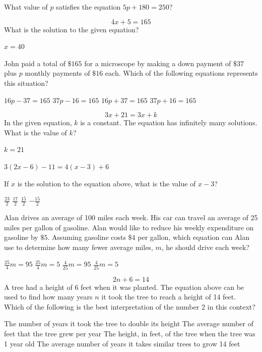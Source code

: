 \question[1]
What value of $p$ satisfies the equation $5p + 180 = 250$?
\begin{choices}
\end{choices}

\newpage 


\question[1]
$$
4x + 5 = 165
$$
What is the solution to the given equation?
\begin{solutionorbox}
$x=40$
\end{solutionorbox}

\question[1]
John paid a total of $\$ 165$ for a microscope by making a down payment of $\$ 37$ plus $p$ monthly payments of $\$ 16$ each. Which of the following equations represents this situation?
\begin{choices}
  \choice $16p - 37 = 165$
  \choice $37p - 16 = 165$
  \CorrectChoice $16p + 37 = 165$
  \choice $37p + 16 = 165$
\end{choices}

\question[1]
$$
3x + 21 = 3x + k
$$
In the given equation, $k$ is a constant. The equation has infinitely many solutions. What is the value of $k$?
\begin{solutionorbox}
$k=21$
\end{solutionorbox}

\newpage

\question[1]
$3(2x - 6) - 11 = 4(x - 3) + 6$

If $x$ is the solution to the equation above, what is the value of $x - 3$?
\begin{choices}
  \choice $\frac{23}{2}$
  \CorrectChoice $\frac{17}{2}$
  \choice $\frac{15}{2}$
  \choice $-\frac{15}{2}$
\end{choices}

\question[1]
Alan drives an average of 100 miles each week. His car can travel an average of 25 miles per gallon of gasoline. Alan would like to reduce his weekly expenditure on gasoline by $\$ 5$. Assuming gasoline costs $\$ 4$ per gallon, which equation can Alan use to determine how many fewer average miles, $m$, he should drive each week?
\begin{choices}
  \choice $\frac{25}{4}m = 95$
  \choice $\frac{25}{4}m = 5$
  \choice $\frac{4}{25}m = 95$
  \CorrectChoice $\frac{4}{25}m = 5$
\end{choices}

\question[1]
$$
2n + 6 = 14
$$
A tree had a height of 6 feet when it was planted. The equation above can be used to find how many years $n$ it took the tree to reach a height of 14 feet. Which of the following is the best interpretation of the number 2 in this context?
\begin{choices}
  \choice The number of years it took the tree to double its height
  \CorrectChoice The average number of feet that the tree grew per year
  \choice The height, in feet, of the tree when the tree was 1 year old
  \choice The average number of years it takes similar trees to grow 14 feet
\end{choices}

